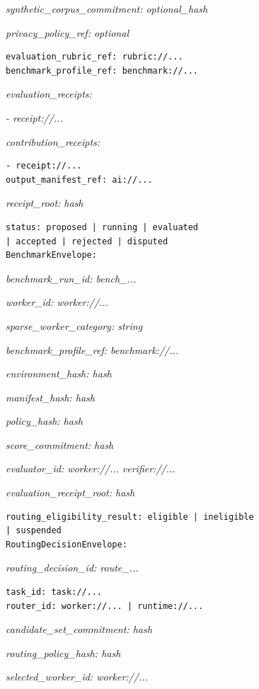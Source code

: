 \documentclass[
  11pt,
]{article}
\begin{document}
\emph{synthetic\_corpus\_commitment: optional\_hash}

\emph{privacy\_policy\_ref: optional}

\begin{lstlisting}[language=rustioi]
evaluation_rubric_ref: rubric://...
benchmark_profile_ref: benchmark://...
\end{lstlisting}
\emph{evaluation\_receipts:}

\emph{- receipt://...}

\emph{contribution\_receipts:}

\begin{lstlisting}[language=rustioi]
- receipt://...
output_manifest_ref: ai://...
\end{lstlisting}
\emph{receipt\_root: hash}

\begin{lstlisting}[language={},basicstyle=\ttfamily\scriptsize]
status: proposed | running | evaluated
| accepted | rejected | disputed
BenchmarkEnvelope:
\end{lstlisting}
\emph{benchmark\_run\_id: bench\_...}

\emph{worker\_id: worker://...}

\emph{sparse\_worker\_category: string}

\emph{benchmark\_profile\_ref: benchmark://...}

\emph{environment\_hash: hash}

\emph{manifest\_hash: hash}

\emph{policy\_hash: hash}

\emph{score\_commitment: hash}

\emph{evaluator\_id: worker://... \textbar{} verifier://...}

\emph{evaluation\_receipt\_root: hash}

\begin{lstlisting}[language={},basicstyle=\ttfamily\scriptsize]
routing_eligibility_result: eligible | ineligible
| suspended
RoutingDecisionEnvelope:
\end{lstlisting}
\emph{routing\_decision\_id: route\_...}

\begin{lstlisting}[language=rustioi]
task_id: task://...
router_id: worker://... | runtime://...
\end{lstlisting}
\emph{candidate\_set\_commitment: hash}

\emph{routing\_policy\_hash: hash}

\emph{selected\_worker\_id: worker://...}
\end{document}
